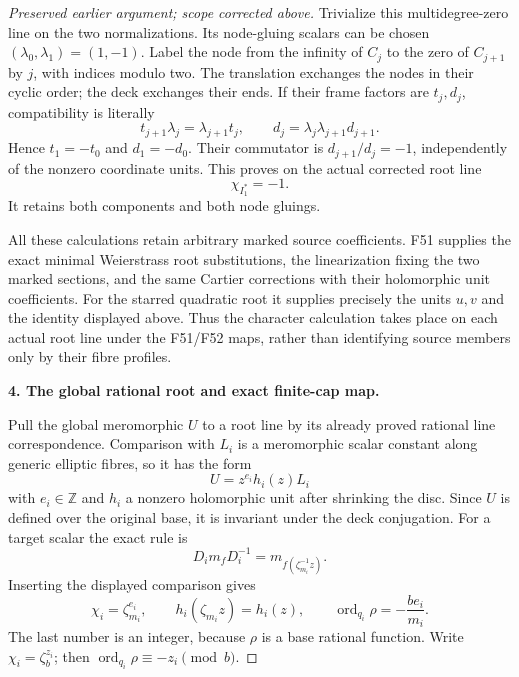 \begin{proof}[Preserved earlier argument; scope corrected above]
Trivialize this multidegree-zero line on the two normalizations.
Its node-gluing scalars can be chosen \((\lambda_0,\lambda_1)
=(1,-1)\). Label the node from the infinity of \(C_j\) to
the zero of \(C_{j+1}\) by \(j\), with indices modulo two.
The translation exchanges the nodes in their cyclic order;
the deck exchanges their ends. If their frame factors are
\(t_j,d_j\), compatibility is literally
\[
 t_{j+1}\lambda_j=\lambda_{j+1}t_j,\qquad
 d_j=\lambda_j\lambda_{j+1}d_{j+1}.
\]
Hence \(t_1=-t_0\) and \(d_1=-d_0\). Their commutator is
\(d_{j+1}/d_j=-1\), independently of the nonzero coordinate
units. This proves on the actual corrected root line
\[
                         \chi_{I_1^*}=-1.              \tag{P3K.35.12}
\]
It retains both components and both node gluings.

All these calculations retain arbitrary marked source coefficients.
F51 supplies the exact minimal Weierstrass root substitutions,
the linearization fixing the two marked sections, and the same
Cartier corrections with their holomorphic unit coefficients.
For the starred quadratic root it supplies precisely the units
\(u,v\) and the identity displayed above. Thus the character
calculation takes place on each actual root line under the F51/F52
maps, rather than identifying source members only by their fibre
profiles.

\par\medskip\noindent\textbf{4. The global rational root and exact finite-cap map.}\enspace

Pull the global meromorphic \(U\) to a root line by its already
proved rational line correspondence. Comparison with \(L_i\)
is a meromorphic scalar constant along generic elliptic fibres,
so it has the form
\[
                          U=z^{e_i}h_i(z)L_i
\]
with \(e_i\in\mathbb Z\) and \(h_i\) a nonzero holomorphic
unit after shrinking the disc. Since \(U\) is defined over
the original base, it is invariant under the deck conjugation.
For a target scalar the exact rule is
\[
 D_i m_f D_i^{-1}=m_{f(\zeta_{m_i}^{-1}z)}.
\]
Inserting the displayed comparison gives
\[
 \chi_i=\zeta_{m_i}^{e_i},\qquad
 h_i(\zeta_{m_i}z)=h_i(z),\qquad
 \operatorname{ord}_{q_i}\rho=-\frac{be_i}{m_i}.        \tag{P3K.35.13}
\]
The last number is an integer, because \(\rho\) is a base
rational function. Write \(\chi_i=\zeta_b^{z_i}\); then
\(\operatorname{ord}_{q_i}\rho\equiv-z_i\pmod b\).


\end{proof}
